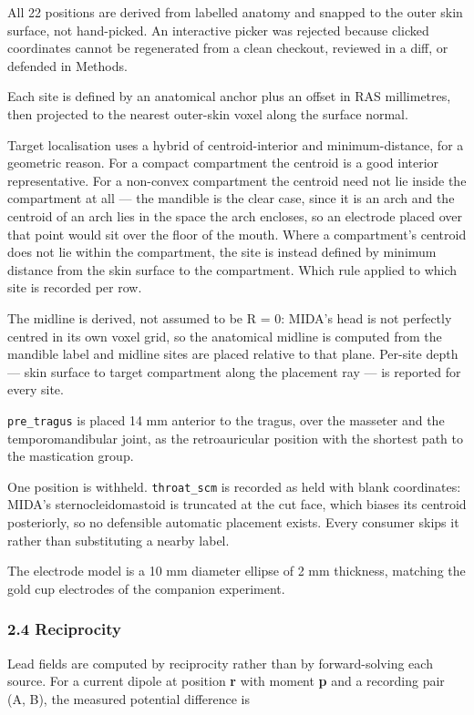 \documentclass[
  11pt,
]{article}
\begin{document}
All 22 positions are derived from labelled anatomy and snapped to the outer skin
surface, not hand-picked. An interactive picker was rejected because clicked
coordinates cannot be regenerated from a clean checkout, reviewed in a diff, or
defended in Methods.

Each site is defined by an anatomical anchor plus an offset in RAS millimetres,
then projected to the nearest outer-skin voxel along the surface normal.

Target localisation uses a hybrid of centroid-interior and minimum-distance, for
a geometric reason. For a compact compartment the centroid is a good interior
representative. For a non-convex compartment the centroid need not lie inside
the compartment at all --- the mandible is the clear case, since it is an arch and
the centroid of an arch lies in the space the arch encloses, so an electrode
placed over that point would sit over the floor of the mouth. Where a
compartment's centroid does not lie within the compartment, the site is instead
defined by minimum distance from the skin surface to the compartment. Which rule
applied to which site is recorded per row.

The midline is derived, not assumed to be R = 0: MIDA's head is not perfectly
centred in its own voxel grid, so the anatomical midline is computed from the
mandible label and midline sites are placed relative to that plane. Per-site
depth --- skin surface to target compartment along the placement ray --- is reported
for every site.

\texttt{pre\_tragus} is placed 14 mm anterior to the tragus, over the masseter and the
temporomandibular joint, as the retroauricular position with the shortest path
to the mastication group.

One position is withheld. \texttt{throat\_scm} is recorded as held with blank
coordinates: MIDA's sternocleidomastoid is truncated at the cut face, which
biases its centroid posteriorly, so no defensible automatic placement exists.
Every consumer skips it rather than substituting a nearby label.

The electrode model is a 10 mm diameter ellipse of 2 mm thickness, matching the
gold cup electrodes of the companion experiment.

\subsubsection{2.4 Reciprocity}\label{reciprocity}

Lead fields are computed by reciprocity rather than by forward-solving each
source. For a current dipole at position \textbf{r} with moment \textbf{p} and a recording
pair (A, B), the measured potential difference is
\end{document}
